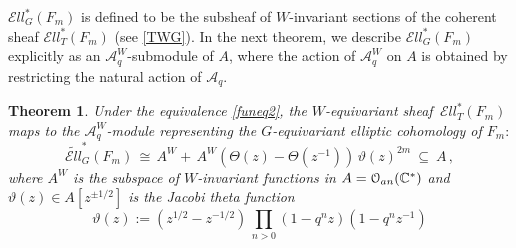 \documentclass[11pt]{amsart}
\newtheorem{theorem}{Theorem}[section]
\theoremstyle{definition}
\theoremstyle{remark}
\numberwithin{equation}{section}
\newcommand{\la}{\label}
\def\c{\mathbb{C}}
\def\A{\mathcal{A}}
\def\O{\mathcal{O}}
\def\Ell{\mathcal{E}{ll}}
\begin{document}
$ \Ell_G^*(F_m) $ is defined to be the subsheaf of $W$-invariant sections of the coherent sheaf
$ \Ell_T^*(F_m)$ (see \eqref{TWG}). In the next theorem, we describe $ \Ell_G^*(F_m) $ explicitly as an 
$\A_q^W$-submodule of $A$, where the action of $ \A_q^W $ on $A$ is obtained by restricting the
natural action of $ \A_q $.
%
\begin{theorem}
\la{ThElT}
Under the equivalence \eqref{funeq2}, the $W$-equivariant  sheaf $\,\Ell_T^*(F_m)\,$ maps to the $ \A_q^W$-module representing the $G$-equivariant elliptic cohomology of $ F_m:$
%
\begin{equation}
\la{EllG}
\widetilde{\Ell}_G^*(F_m)\,\cong\,
A^W + \,A^W (\Theta(z) - \Theta(z^{-1}))\,\vartheta(z)^{2m}\ \subseteq \ A\,,
\end{equation}
%
where $A^W$ is the subspace of $W$-invariant functions in $A = \O_{\rm an}(\c^*)$ and
$ \vartheta(z) \in A[z^{\pm 1/2}] $ is the Jacobi theta function
%
\begin{equation}
\la{jacth}
\vartheta(z) :=  (z^{1/2}-z^{-1/2})\,\prod_{n>0}(1-q^n z)(1-q^{n}z^{-1})
\end{equation}
%
\end{theorem}
%
\end{document}
